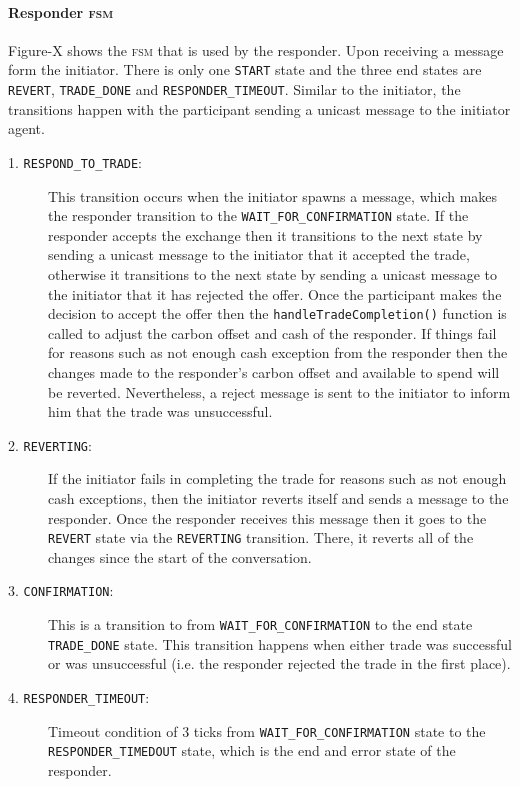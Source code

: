\paragraph{Responder \textsc{fsm}}
 
Figure-X shows the \textsc{fsm} that is used by the responder. Upon receiving a message form the initiator. There is only one \texttt{START} state and the three end states are \texttt{REVERT}, \texttt{TRADE\_DONE} and \texttt{RESPONDER\_TIMEOUT}. Similar to the initiator, the transitions happen with the participant sending a unicast message to the initiator agent.
 
\begin{description}
	\item[1. \texttt{RESPOND\_TO\_TRADE}:]
	This transition occurs when the initiator spawns a message, which makes the responder transition to the \texttt{WAIT\_FOR\_CONFIRMATION} state. If the responder accepts the exchange then it transitions to the next state by sending a unicast message to the initiator that it accepted the trade, otherwise it transitions to the next state by sending a unicast message to the initiator that it has rejected the offer. Once the participant makes the decision to accept the offer then the \texttt{handleTradeCompletion()} function is called to adjust the carbon offset and cash of the responder. If things fail for reasons such as not enough cash exception from the responder then the changes made to the responder’s carbon offset and available to spend will be reverted. Nevertheless, a reject message is sent to the initiator to inform him that the trade was unsuccessful.
	\item[2. \texttt{REVERTING}:]
	If the initiator fails in completing the trade for reasons such as not enough cash exceptions, then the initiator reverts itself and sends a message to the responder. Once the responder receives this message then it goes to the \texttt{REVERT} state via the \texttt{REVERTING} transition. There, it reverts all of the changes since the start of the conversation.
	\item[3. \texttt{CONFIRMATION}:]
	This is a transition to from \texttt{WAIT\_FOR\_CONFIRMATION} to the end state \texttt{TRADE\_DONE} state. This transition happens when either trade was successful or was unsuccessful (i.e. the responder rejected the trade in the first place).
	\item[4. \texttt{RESPONDER\_TIMEOUT}:]
	Timeout condition of 3 ticks from \texttt{WAIT\_FOR\_CONFIRMATION} state to the \texttt{RESPONDER\_TIMEDOUT} state, which is the end and error state of the responder.
\end{description}

